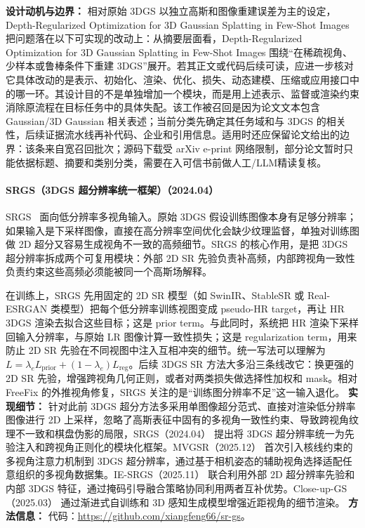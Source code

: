 \textbf{设计动机与边界：} 相对原始 3DGS 以独立高斯和图像重建误差为主的设定，Depth-Regularized Optimization for 3D Gaussian Splatting in Few-Shot Images 把问题落在以下可实现的改动上：从摘要层面看，Depth-Regularized Optimization for 3D Gaussian Splatting in Few-Shot Images 围绕“在稀疏视角、少样本或鲁棒条件下重建 3DGS”展开。若其正文或代码后续可读，应进一步核对它具体改动的是表示、初始化、渲染、优化、损失、动态建模、压缩或应用接口中的哪一环。其设计目的不是单独增加一个模块，而是用上述表示、监督或渲染约束消除原流程在目标任务中的具体失配。该工作被召回是因为论文文本包含 Gaussian/3D Gaussian 相关表述；当前分类先确定其任务域和与 3DGS 的相关性，后续证据流水线再补代码、企业和引用信息。适用时还应保留论文给出的边界：该条来自宽召回批次；源码下载受 arXiv e-print 网络限制，部分论文暂时只能依据标题、摘要和类别分类，需要在入可信书前做人工/LLM精读复核。
\paragraph{SRGS（3DGS 超分辨率统一框架）（2024.04）}
SRGS~\cite{2404_10318} 面向低分辨率多视角输入。原始 3DGS 假设训练图像本身有足够分辨率；如果输入是下采样图像，直接在高分辨率空间优化会缺少纹理监督，单独对训练图做 2D 超分又容易生成视角不一致的高频细节。SRGS 的核心作用，是把 3DGS 超分辨率拆成两个可复用模块：外部 2D SR 先验负责补高频，内部跨视角一致性负责约束这些高频必须能被同一个高斯场解释。

在训练上，SRGS 先用固定的 2D SR 模型（如 SwinIR、StableSR 或 Real-ESRGAN 类模型）把每个低分辨率训练视图变成 pseudo-HR target，再让 HR 3DGS 渲染去拟合这些目标；这是 prior term。与此同时，系统把 HR 渲染下采样回输入分辨率，与原始 LR 图像计算一致性损失；这是 regularization term，用来防止 2D SR 先验在不同视图中注入互相冲突的细节。统一写法可以理解为 $L=\lambda_e L_{\mathrm{prior}} + (1-\lambda_e)L_{\mathrm{reg}}$。后续 3DGS SR 方法大多沿三条线改它：换更强的 2D SR 先验，增强跨视角几何正则，或者对两类损失做选择性加权和 mask。相对 FreeFix 的外推视角修复，SRGS 关注的是“训练图分辨率不足”这一输入退化。
\textbf{实现细节：} 针对此前 3DGS 超分方法多采用单图像超分范式、直接对渲染低分辨率图像进行 2D 上采样，忽略了高斯表征中固有的多视角一致性约束、导致跨视角纹理不一致和棋盘伪影的局限，SRGS（2024.04） 提出将 3DGS 超分辨率统一为先验注入和跨视角正则化的模块化框架。MVGSR（2025.12） 首次引入核线约束的多视角注意力机制到 3DGS 超分辨率，通过基于相机姿态的辅助视角选择适配任意组织的多视角数据集。IE-SRGS（2025.11） 联合利用外部 2D 超分辨率先验和内部 3DGS 特征，通过掩码引导融合策略协同利用两者互补优势。Close-up-GS（2025.03） 通过渐进式自训练和 3D 感知生成模型增强近距视角的细节渲染。
\textbf{方法信息：} 代码：\url{https://github.com/xiangfeng66/sr-gs}。



